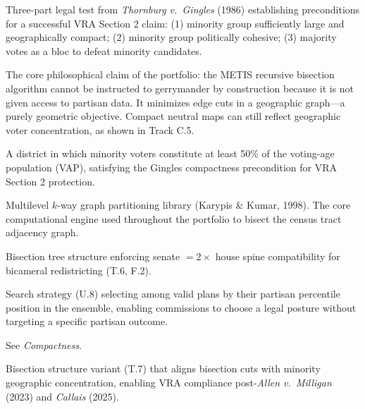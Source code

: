 \documentclass[12pt]{article}
\begin{document}
\begin{description}[leftmargin=2.2cm,style=nextline,noitemsep,topsep=4pt]
    \item[Gingles test] Three-part legal test from \emph{Thornburg v.\ Gingles}
        (1986) establishing preconditions for a successful VRA Section 2 claim:
        (1) minority group sufficiently large and geographically compact;
        (2) minority group politically cohesive; (3) majority votes as a bloc
        to defeat minority candidates.

    \item[Impossibility defense] The core philosophical claim of the portfolio:
        the METIS recursive bisection algorithm cannot be instructed to
        gerrymander by construction because it is not given access to partisan
        data. It minimizes edge cuts in a geographic graph---a purely geometric
        objective. Compact neutral maps can still reflect geographic voter
        concentration, as shown in Track C.5.

    \item[Majority-minority district] A district in which minority voters
        constitute at least 50\% of the voting-age population (VAP), satisfying
        the Gingles compactness precondition for VRA Section 2 protection.

    \item[METIS] Multilevel $k$-way graph partitioning library (Karypis \&
        Kumar, 1998). The core computational engine used throughout the
        portfolio to bisect the census tract adjacency graph.

    \item[NestSection] Bisection tree structure enforcing senate $= 2\times$
        house spine compatibility for bicameral redistricting (T.6, F.2).

    \item[PercentileSweep] Search strategy (U.8) selecting among valid plans
        by their partisan percentile position in the ensemble, enabling
        commissions to choose a legal posture without targeting a specific
        partisan outcome.

    \item[Polsby-Popper] See \emph{Compactness}.

    \item[VRASection] Bisection structure variant (T.7) that aligns bisection
        cuts with minority geographic concentration, enabling VRA compliance
        post-\emph{Allen v.\ Milligan} (2023) and \emph{Callais} (2025).
\end{description}
\end{document}
